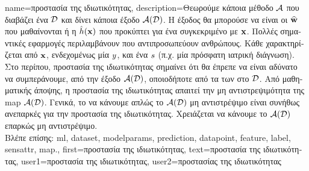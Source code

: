 {name={\foreignlanguage{greek}{προστασία της ιδιωτικότητας}},
     description={\foreignlanguage{greek}{Θεωρούμε κάποια μέθοδο}  $\mathcal{A}$ 
        		\foreignlanguage{greek}{που διαβάζει ένα} 
		 $\mathcal{D}$ \foreignlanguage{greek}{και δίνει κάποια έξοδο $\mathcal{A}(\mathcal{D})$. Η έξοδος 
		θα μπορούσε να είναι οι}  $\widehat{{\bf w}}$ \foreignlanguage{greek}{που μαθαί\-νονται ή η}  
		$\hat{h}({\bf x})$ \foreignlanguage{greek}{που προκύπτει για ένα συγκεκριμένο}  \foreignlanguage{greek}{με} 
		 ${\bf x}$. \foreignlanguage{greek}{Πολλές σημαντικές εφαρμογές}  
		\foreignlanguage{greek}{περιλαμβάνουν}  \foreignlanguage{greek}{που αντιπροσωπεύουν ανθρώπους. Κάθε} 
		 \foreignlanguage{greek}{χαρακτηρίζεται από}  ${\bf x}$, 
		\foreignlanguage{greek}{ενδεχομένως μία}  $y$, \foreignlanguage{greek}{και ένα}  $s$ 
		\foreignlanguage{greek}{(π.χ. μία πρόσφατη ιατρική διάγνωση). 
		Στο περίπου, προστασία της ιδιωτικότητας σημαίνει ότι θα έπρεπε να είναι αδύνατο να συμπεράνουμε, από την έξοδο $\mathcal{A}(\mathcal{D})$, 
		οποιοδήποτε από τα}  \foreignlanguage{greek}{των}  \foreignlanguage{greek}{στο} $\mathcal{D}$. 
		\foreignlanguage{greek}{Από μαθηματικής άποψης, η προστασία της ιδιωτικότητας απαιτεί την μη αντιστρεψιμότητα της} \gls{map}  
		$\mathcal{A}(\mathcal{D})$. \foreignlanguage{greek}{Γενικά, το να κάνουμε απλώς το $\mathcal{A}(\mathcal{D})$ μη αντιστρέψιμο 
		είναι συνήθως ανεπαρκές για την προστασία της ιδιωτικότητας. Χρειάζεται να κάνουμε το $\mathcal{A}(\mathcal{D})$ επαρκώς μη αντιστρέψιμο.}\\
		\foreignlanguage{greek}{Βλέπε επίσης:} \gls{ml}, \gls{dataset}, \gls{modelparams}, \gls{prediction}, \gls{datapoint}, \gls{feature}, \gls{label}, \gls{sensattr}, \gls{map}.}, 
	first={\foreignlanguage{greek}{προστασία της ιδιωτικότητας}}, 
	text={\foreignlanguage{greek}{προστασία της ιδιωτικότητας}},
	user1={\foreignlanguage{greek}{προστασία της ιδιωτικότητας}}, %
   	user2={\foreignlanguage{greek}{προστασίας της ιδιωτικότητας}} %
}

